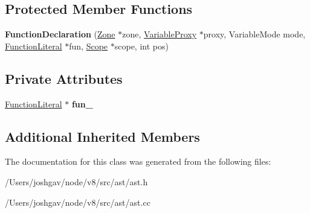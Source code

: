 \subsection*{Protected Member Functions}
\begin{DoxyCompactItemize}
\item 
{\bfseries Function\+Declaration} (\hyperlink{classv8_1_1internal_1_1_zone}{Zone} $\ast$zone, \hyperlink{classv8_1_1internal_1_1_variable_proxy}{Variable\+Proxy} $\ast$proxy, Variable\+Mode mode, \hyperlink{classv8_1_1internal_1_1_function_literal}{Function\+Literal} $\ast$fun, \hyperlink{classv8_1_1internal_1_1_scope}{Scope} $\ast$scope, int pos)\hypertarget{classv8_1_1internal_1_1_function_declaration_a9e777d89cd5c53c0194bdf6820d1839a}{}\label{classv8_1_1internal_1_1_function_declaration_a9e777d89cd5c53c0194bdf6820d1839a}

\end{DoxyCompactItemize}
\subsection*{Private Attributes}
\begin{DoxyCompactItemize}
\item 
\hyperlink{classv8_1_1internal_1_1_function_literal}{Function\+Literal} $\ast$ {\bfseries fun\+\_\+}\hypertarget{classv8_1_1internal_1_1_function_declaration_a4c287ad795c7694c3e767f9c7e527fef}{}\label{classv8_1_1internal_1_1_function_declaration_a4c287ad795c7694c3e767f9c7e527fef}

\end{DoxyCompactItemize}
\subsection*{Additional Inherited Members}


The documentation for this class was generated from the following files\+:\begin{DoxyCompactItemize}
\item 
/\+Users/joshgav/node/v8/src/ast/ast.\+h\item 
/\+Users/joshgav/node/v8/src/ast/ast.\+cc\end{DoxyCompactItemize}
